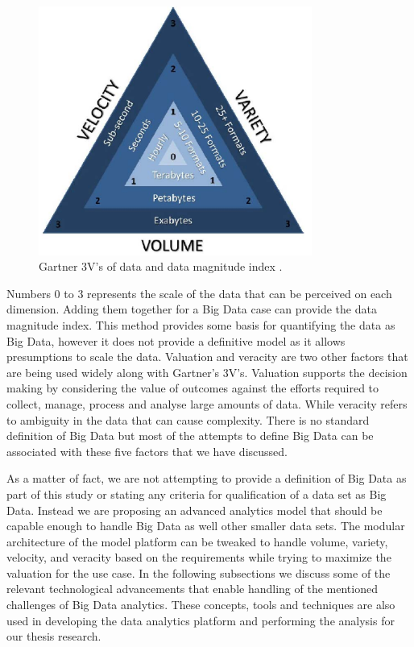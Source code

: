 \begin{figure}[ht]
  \begin{center}
    \includegraphics[width=0.8\textwidth]{images/3Vs.pdf}
    \caption{Gartner 3V's of data and data magnitude index \cite{laney20013d}.}
    \label{fig:3Vs}
  \end{center}
\end{figure}

Numbers 0 to 3 represents the scale of the data that can be perceived on each dimension. Adding them together for a Big Data case can provide the data magnitude index. This method provides some basis for quantifying the data as Big Data, however it does not provide a definitive model as it allows presumptions to scale the data. Valuation and veracity are two other factors that are being used widely along with Gartner's 3V's. Valuation supports the decision making by considering the value of outcomes against the efforts required to collect, manage, process and analyse large amounts of data.  While veracity refers to ambiguity in the data that can cause complexity. There is no standard definition of Big Data but most of the attempts to define Big Data can be associated with these five factors that we have discussed.

As a matter of fact, we are not attempting to provide a definition of Big Data as part of this study or stating any criteria for qualification of a data set as Big Data. Instead we are proposing an advanced analytics model that should be capable enough to handle Big Data as well other smaller data sets. The modular architecture of the model platform can be tweaked to handle volume, variety, velocity, and veracity based on the requirements while trying to maximize the valuation for the use case. In the following subsections we discuss some of the relevant technological advancements that enable handling of the mentioned challenges of Big Data analytics. These concepts, tools and techniques are also used in developing the data analytics platform and performing the analysis for our thesis research.

